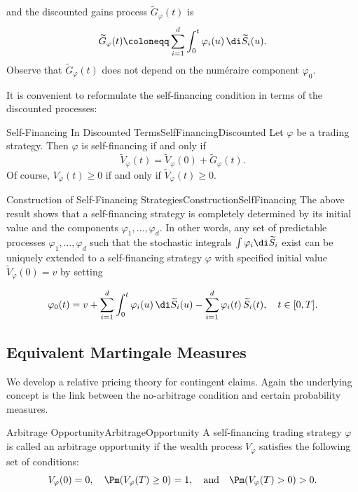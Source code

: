 and the discounted gains process \(\widetilde{G}_{\varphi}(t)\) is
\begin{equation}\label{eq:DiscountedGainsProcess}
	\widetilde{G}_{\varphi}(t) \coloneqq \sum_{i=1}^{d} \int_{0}^{t} \varphi_i(u)\,\di \widetilde{S}_i(u).
\end{equation}
Observe that \(\widetilde{G}_{\varphi}(t)\) does not depend on the num\'{e}raire component \(\varphi_0\).

It is convenient to reformulate the self-financing condition in terms of the discounted processes:

\begin{prop}{Self-Financing In Discounted Terms}{SelfFinancingDiscounted}
	Let \(\varphi\) be a trading strategy. Then \(\varphi\) is self-financing if and only if
	\begin{equation}\label{eq:SelfFinancingDiscounted}
		\widetilde{V}_{\varphi}(t) = \widetilde{V}_{\varphi}(0) + \widetilde{G}_{\varphi}(t).
	\end{equation}
	Of course, \(V_{\varphi}(t) \ge 0\) if and only if \(\widetilde{V}_{\varphi}(t) \ge 0\).
\end{prop}

\begin{xtip}{Construction of Self-Financing Strategies}{ConstructionSelfFinancing}
	The above result shows that a self-financing strategy is completely determined by its initial value and the components \(\varphi_1, \dots, \varphi_d\). In other words, any set of predictable processes \(\varphi_1, \dots, \varphi_d\) such that the stochastic integrals \(\int \varphi_i \di \widetilde{S}_i\) exist can be uniquely extended to a self-financing strategy \(\varphi\) with specified initial value \(\widetilde{V}_{\varphi}(0)=v\) by setting

	\[
		\varphi_0(t) = v + \sum_{i=1}^{d} \int_{0}^{t} \varphi_i(u)\,\di \widetilde{S}_i(u) - \sum_{i=1}^{d} \varphi_i(t)\,\widetilde{S}_i(t), \quad t \in [0,T].
	\]
\end{xtip}

\subsection{Equivalent Martingale Measures}

We develop a relative pricing theory for contingent claims. Again the underlying concept is the link between the no-arbitrage condition and certain probability measures.

\begin{defn}{Arbitrage Opportunity}{ArbitrageOpportunity}
	A self-financing trading strategy $\varphi$ is called an arbitrage opportunity if the wealth process $V_{\varphi}$ satisfies the following set of conditions:
	\[
		V_{\varphi}(0) = 0, \quad \Pm(V_{\varphi}(T) \ge 0) = 1, \quad \text{and} \quad \Pm(V_{\varphi}(T) > 0) > 0.
	\]
\end{defn}

